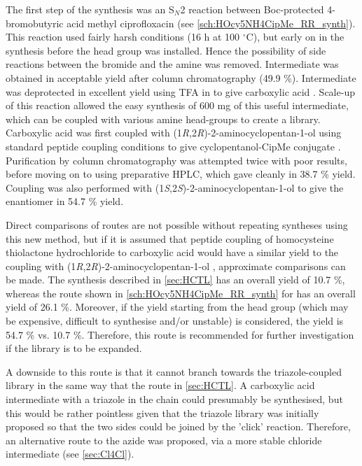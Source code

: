 The first step of the synthesis was an S$_N$2 reaction between Boc-protected 4-bromobutyric acid  methyl ciprofloxacin  (see \ref{sch:HOcy5NH4CipMe_RR_synth}). This reaction used fairly harsh conditions (16 h at 100 $^{\circ}$C), but early on in the synthesis before the head group was installed. Hence the possibility of side reactions between the bromide and the amine was removed. Intermediate  was obtained in acceptable yield after column chromatography (49.9 \%).
Intermediate  was deprotected in excellent yield using TFA in  to give carboxylic acid . Scale-up of this reaction allowed the easy synthesis of 600 mg of this useful intermediate, which can be coupled with various amine head-groups to create a library.
Carboxylic acid  was first coupled with (1\textit{R},2\textit{R})-2-aminocyclopentan-1-ol  using standard peptide coupling conditions to give cyclopentanol-CipMe conjugate . Purification by column chromatography was attempted twice with poor results, before moving on to using preparative HPLC, which gave  cleanly in 38.7 \% yield.
Coupling was also performed with (1\textit{S},2\textit{S})-2-aminocyclopentan-1-ol  to give the enantiomer  in 54.7 \% yield.

Direct comparisons of routes are not possible without repeating syntheses using this new method, but if it is assumed that peptide coupling of homocysteine thiolactone hydrochloride  to carboxylic acid  would have a similar yield to the coupling with (1\textit{R},2\textit{R})-2-aminocyclopentan-1-ol , approximate comparisons can be made.
The synthesis described in \ref{sec:HCTL} has an overall yield of 10.7 \%, whereas the route shown in \ref{sch:HOcy5NH4CipMe_RR_synth} for  has an overall yield of 26.1 \%. Moreover, if the yield starting from the head group (which may be expensive, difficult to synthesise and/or unstable) is considered, the yield is 54.7 \% vs. 10.7 \%.
Therefore, this route is recommended for further investigation if the library is to be expanded.

A downside to this route is that it cannot branch towards the triazole-coupled library in the same way that the route in \ref{sec:HCTL}. A carboxylic acid intermediate with a triazole in the chain could presumably be synthesised, but this would be rather pointless given that the triazole library was initially proposed so that the two sides could be joined by the 'click' reaction.
Therefore, an alternative route to the azide was proposed, via a more stable chloride intermediate (see \ref{sec:Cl4Cl}).

